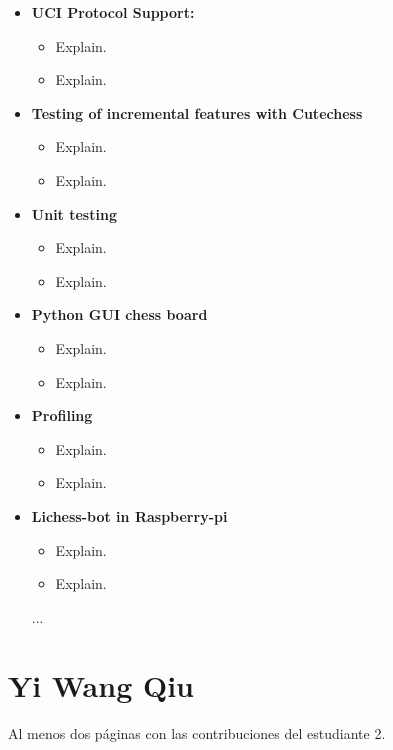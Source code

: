 \begin{itemize}
    \item \textbf{UCI Protocol Support:}
    \begin{itemize}
        \item Explain.
        \item Explain.
    \end{itemize}
  
    \item \textbf{Testing of incremental features with Cutechess}
    \begin{itemize}
        \item Explain.
        \item Explain.
    \end{itemize}

    \item \textbf{Unit testing}
    \begin{itemize}
        \item Explain.
        \item Explain.
    \end{itemize}

    \item \textbf{Python GUI chess board}
    \begin{itemize}
        \item Explain.
        \item Explain.
    \end{itemize}

    \item \textbf{Profiling}
    \begin{itemize}
        \item Explain.
        \item Explain.
    \end{itemize}

    \item \textbf{Lichess-bot in Raspberry-pi}
    \begin{itemize}
        \item Explain.
        \item Explain.
    \end{itemize}

    ...
\end{itemize}

\section*{Yi Wang Qiu}

Al menos dos páginas con las contribuciones del estudiante 2.

